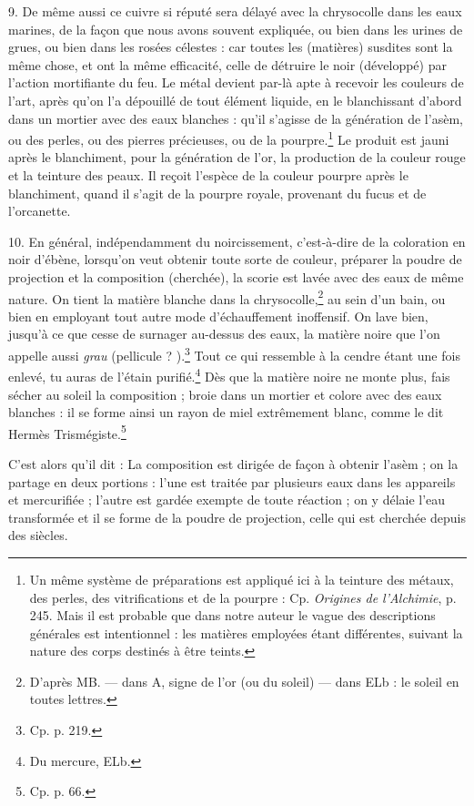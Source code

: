 \documentclass[a4paper, 11pt, oneside, polutonikogreek, french]{article}
\begin{document}
9. De même aussi ce cuivre si réputé sera délayé avec la chrysocolle dans les eaux marines, de la façon que nous avons souvent expliquée, ou bien dans les urines de grues, ou bien dans les rosées célestes : car toutes les (matières) susdites sont la même chose, et ont la même efficacité, celle de détruire le noir (développé) par l'action mortifiante du feu. Le métal devient par-là apte à recevoir les couleurs de l'art, après qu'on l'a dépouillé de tout élément liquide, en le blanchissant d'abord dans un mortier avec des eaux blanches : qu'il s'agisse de la génération de l'asèm, ou des perles, ou des pierres précieuses, ou de la pourpre.\footnote{Un même système de préparations est appliqué ici à la teinture des métaux, des perles, des vitrifications et de la pourpre : Cp. \emph{Origines de l'Alchimie}, p. 245. Mais il est probable que dans notre auteur le vague des descriptions générales est intentionnel : les matières employées étant différentes, suivant la nature des corps destinés à être teints.} Le produit est jauni après le blanchiment, pour la génération de l'or, la production de la couleur rouge et la teinture des peaux. Il reçoit l'espèce de la couleur pourpre après le blanchiment, quand il s'agit de la pourpre royale, provenant du fucus et de l'orcanette.

10. En général, indépendamment du noircissement, c'est-à-dire de la coloration en noir d'ébène, lorsqu'on veut obtenir toute sorte de couleur, préparer la poudre de projection et la composition (cherchée), la scorie est lavée avec des eaux de même nature. On tient la matière blanche dans la chrysocolle,\footnote{D'après MB. --- dans A, signe de l'or (ou du soleil) --- dans ELb : le soleil en toutes lettres.} au sein d'un bain, ou bien en employant tout autre mode d'échauffement inoffensif. On lave bien, jusqu'à ce que cesse de surnager au-dessus des eaux, la matière noire que l'on appelle aussi \emph{grau} (pellicule ? ).\footnote{Cp. p. 219.} Tout ce qui ressemble à la cendre étant une fois enlevé, tu auras de l'étain purifié.\footnote{Du mercure, ELb.} Dès que la matière noire ne monte plus, fais sécher au soleil la composition ; broie dans un mortier et colore avec des eaux blanches : il se forme ainsi un rayon de miel extrêmement blanc, comme le dit Hermès Trismégiste.\footnote{Cp. p. 66.}

C'est alors qu'il dit : La composition est dirigée de façon à obtenir l'asèm ; on la partage en deux portions : l'une est traitée par plusieurs eaux dans les appareils et mercurifiée ; l'autre est gardée exempte de toute réaction ; on y délaie l'eau transformée et il se forme de la poudre de projection, celle qui est cherchée depuis des siècles.
\end{document}
